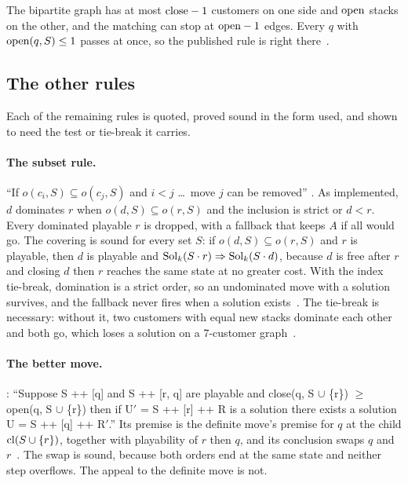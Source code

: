 The bipartite graph has at most $\mathrm{close}-1$ customers on one side and $\mathrm{open}$
stacks on the other, and the matching can stop at $\mathrm{open}-1$ edges. Every $q$
with $\mathrm{open}(q,S)\le1$ passes at once, so the published rule is right
there~.

\subsection{The other rules}
\label{sec:other-rules}

Each of the remaining rules is quoted, proved sound in the form used, and
shown to need the test or tie-break it carries.

\paragraph{The subset rule.} ``If $o(c_i,S)\subseteq o(c_j,S)$ and $i<j$ \dots\
move $j$ can be removed'' \citep[\S2, p.~5]{ChuStuckey2009}. As implemented,
$d$ dominates $r$ when $o(d,S)\subseteq o(r,S)$ and the inclusion is strict or
$d<r$. Every dominated playable $r$ is dropped, with a fallback that keeps $A$
if all would go. The covering is sound for every set $S$: if
$o(d,S)\subseteq o(r,S)$ and $r$ is playable, then $d$ is playable and
$\mathrm{Sol}_k(S\cdot r)\Rightarrow \mathrm{Sol}_k(S\cdot d)$, because $d$ is free after $r$
and closing $d$ then $r$ reaches the same state at no greater cost. With the
index tie-break, domination is a strict order, so an undominated move with a
solution survives, and the fallback never fires when a solution
exists~. The tie-break is necessary: without it, two customers
with equal new stacks dominate each other and both go, which loses a solution
on a 7-customer graph~\leanref{tiebreak}.

\paragraph{The better move.} \citet[\S3.2, p.~6]{ChuStuckey2009}: ``Suppose
S ++ [q] and S ++ [r, q] are playable and close(q, S $\cup$ \{r\}) $\ge$
open(q, S $\cup$ \{r\}) then if U$'$ = S ++ [r] ++ R is a solution there exists a
solution U = S ++ [q] ++ R$'$.'' Its premise is the definite move's premise for
$q$ at the child $\mathrm{cl}(S\cup\{r\})$, together with playability of $r$ then $q$,
and its conclusion swaps $q$ and $r$~\leanref{isbetter}. The swap is sound,
because both orders end at the same state and neither step overflows. The
appeal to the definite move is not.

